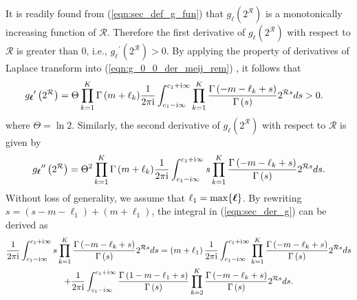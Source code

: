 \documentclass[12pt,onecolumn,draftcls]{IEEEtran}
\newcommand{\bs}{\boldsymbol}
\begin{document}
It is readily found from (\ref{eqn:sec_def_g_fun}) that ${g_{\bs{\ell}}}\left( 2^{\mathcal R} \right)$ is a monotonically increasing function of $\mathcal R$. Therefore the first derivative of ${g_{\bs{\ell}}}\left( 2^{\mathcal R} \right)$ with respect to $\mathcal R$ is greater than $0$, i.e., ${g_{\bs{\ell}}}^\prime \left( 2^{\mathcal R} \right) > 0$. By applying the property of derivatives of Laplace transform into (\ref{eqn:g_0_0_der_meij_rem}) \cite{debnath2010integral}, it follows that
\begin{align}\label{eqn:first_der_g}
{g_{\bs{\ell}}}^\prime \left( {{2^{\cal R}}} \right) &= \Theta \prod\limits_{k = 1}^K {\Gamma \left( {m + {\ell_k}} \right)} \frac{1}{{2\pi {\rm{i}}}}\int_{{c_1} - {\rm{i}}\infty }^{{c_1} + {\rm{i}}\infty } {\prod\limits_{k = 1}^K {\frac{{\Gamma \left( { - m - {\ell_k} + s} \right)}}{{\Gamma \left( s \right)}}} {2^{{\cal R}s}}ds} > 0. %
\end{align}
where $\Theta = \ln 2$. Similarly, the second derivative of ${g_{\bs{\ell}}}\left( 2^{\mathcal R} \right)$ with respect to $\mathcal R$ is given by
\begin{equation}\label{eqn:sec_der_g}
{g_{\bs{\ell}}}^{\prime \prime }\left( 2^{\mathcal R} \right) = {\Theta^2}\prod\limits_{k = 1}^K {\Gamma \left( {m + {\ell_k}} \right)} \frac{1}{{2\pi {\rm{i}}}}\int_{{c_1} - {\rm{i}}\infty }^{{c_1} + {\rm{i}}\infty } {s\prod\limits_{k = 1}^K {\frac{{\Gamma \left( { - m - {\ell_k} + s} \right)}}{{\Gamma \left( s \right)}}} {2^{{\cal R}s}}ds}.
\end{equation}
Without loss of generality, we assume that $\ell_1={\rm max}\{\bs{\ell}\}$. By rewriting $s=(s - m - \ell_1) + (m + \ell_1)$, the integral in (\ref{eqn:sec_der_g}) can be derived as
\begin{multline}\label{eqn:mellin_g_0_secd}
\frac{1}{{2\pi {\rm{i}}}}\int_{{c_1} - {\rm{i}}\infty }^{{c_1} + {\rm{i}}\infty } {s\prod\limits_{k = 1}^K {\frac{{\Gamma \left( { - m - {\ell_k} + s} \right)}}{{\Gamma \left( s \right)}}} {2^{\mathcal Rs}}ds}
=  \left( {m + {\ell_1}} \right)\frac{1}{{2\pi {\rm{i}}}}\int_{{c_1} - {\rm{i}}\infty }^{{c_1} + {\rm{i}}\infty } {\prod\limits_{k = 1}^K {\frac{{\Gamma \left( { - m - {\ell_k} + s} \right)}}{{\Gamma \left( s \right)}}} {2^{\mathcal Rs}}ds}\\
 + \frac{1}{{2\pi {\rm{i}}}}\int_{{c_1} - {\rm{i}}\infty }^{{c_1} + {\rm{i}}\infty } {\frac{{\Gamma \left( {1 - m - {\ell_1} + s} \right)}}{{\Gamma \left( s \right)}}\prod\limits_{k = 2}^K {\frac{{\Gamma \left( { - m - {\ell_k} + s} \right)}}{{\Gamma \left( s \right)}}} {2^{\mathcal Rs}}ds}.
\end{multline}
\end{document}
